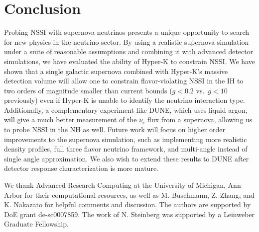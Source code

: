 \documentclass[a4paper,12pt]{article}
\begin{document}
\section{Conclusion}
Probing NSSI with supernova neutrinos presents a unique opportunity to search for new physics in the neutrino sector. By using a realistic supernova simulation under a suite of reasonable assumptions and combining it with advanced detector simulations, we have evaluated the ability of Hyper-K to constrain NSSI. We have shown that a single galactic supernova combined with Hyper-K's massive detection volume will allow one to constrain flavor-violating NSSI in the IH to two orders of magnitude smaller than current bounds ($g < 0.2$ vs.\ $g < 10$ previously) even if Hyper-K is unable to identify the neutrino interaction type. Additionally, a complementary experiment like DUNE, which uses liquid argon, will give a much better measurement of the $\nu_{e}$ flux from a supernova, allowing us to probe NSSI in the NH as well. Future work will focus on higher order improvements to the supernova simulation, such as implementing more realistic density profiles, full three flavor neutrino framework, and multi-angle instead of single angle approximation. We also wish to extend these results to DUNE after detector response characterization is more mature.

\acknowledgments

We thank Advanced Research Computing at the University of Michigan, Ann Arbor for their computational resources, as well as M. Buschmann, Z. Zhang, and K. Nakazato for helpful comments and discussion. The authors are supported by DoE grant de-sc0007859. The work of N. Steinberg was supported by a Leinweber Graduate Fellowship.



\end{document}
